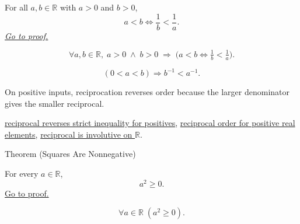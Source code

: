 
\begin{theorem}
\label{thm:ineq-reciprocal-flip}
For all $a, b \in \mathbb{R}$ with $a > 0$ and $b > 0$,
\[
  a < b \iff \frac{1}{b} < \frac{1}{a}.
\]
\hyperref[prf:ineq-reciprocal-flip]{\textit{Go to proof.}}
\end{theorem}



\begin{remark*}
\[
  \forall a, b \in \mathbb{R},\;
  a > 0 \;\land\; b > 0 \;\Rightarrow\;
  \bigl(a < b \iff \tfrac{1}{b} < \tfrac{1}{a}\bigr).
\]
\end{remark*}

\begin{remark*}
\[
(0<a<b)\Rightarrow b^{-1}<a^{-1}.
\]
\end{remark*}

\begin{remark*}[Interpretation]
On positive inputs, reciprocation reverses order because the larger denominator gives the smaller reciprocal.
\end{remark*}

\begin{dependencies}
\hyperref[thm:ineq-reciprocal-positive]{reciprocal reverses strict inequality for positives},
\hyperref[thm:reciprocal-reverses-order-on-positives-r]{reciprocal order for positive real elements},
\hyperref[thm:reciprocal-involutive-on-r]{reciprocal is involutive on $\mathbb{R}$}.
\end{dependencies}

\begin{theorembox}{Theorem (Squares Are Nonnegative)}
\begin{theorem}
\label{thm:square-nonnegative}
For every $a\in\mathbb{R}$,
\[
a^2\ge0.
\]
\hyperref[prf:square-nonnegative]{Go to proof.}
\end{theorem}
\end{theorembox}

\begin{remark*}
\[
\forall a\in\mathbb{R}\;(a^2\ge0).
\]
\end{remark*}

